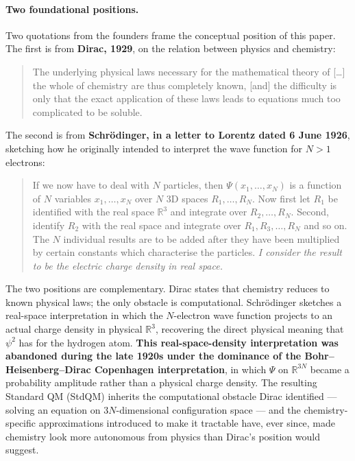 \documentclass[11pt]{article}
\begin{document}
\paragraph{Two foundational positions.}
Two quotations from the founders frame the conceptual position of this paper. The first is from \textbf{Dirac, 1929}, on the relation between physics and chemistry:

\begin{quote}
The underlying physical laws necessary for the mathematical theory of [\ldots] the whole of chemistry are thus completely known, [and] the difficulty is only that the exact application of these laws leads to equations much too complicated to be soluble.
\end{quote}

The second is from \textbf{Schr\"odinger, in a letter to Lorentz dated 6 June 1926}, sketching how he originally intended to interpret the wave function for $N>1$ electrons:

\begin{quote}
If we now have to deal with $N$ particles, then $\Psi(x_1, \ldots, x_N)$ is a function of $N$ variables $x_1, \ldots, x_N$ over $N$ 3D spaces $R_1, \ldots, R_N$. Now first let $R_1$ be identified with the real space $\mathbb{R}^3$ and integrate over $R_2, \ldots, R_N$. Second, identify $R_2$ with the real space and integrate over $R_1, R_3, \ldots, R_N$ and so on. The $N$ individual results are to be added after they have been multiplied by certain constants which characterise the particles. \emph{I consider the result to be the electric charge density in real space.}
\end{quote}

The two positions are complementary. Dirac states that chemistry reduces to known physical laws; the only obstacle is computational. Schr\"odinger sketches a real-space interpretation in which the $N$-electron wave function projects to an actual charge density in physical $\mathbb{R}^3$, recovering the direct physical meaning that $\psi^2$ has for the hydrogen atom. \textbf{This real-space-density interpretation was abandoned during the late 1920s under the dominance of the Bohr--Heisenberg--Dirac Copenhagen interpretation}, in which $\Psi$ on $\mathbb{R}^{3N}$ became a probability amplitude rather than a physical charge density. The resulting Standard QM (StdQM) inherits the computational obstacle Dirac identified --- solving an equation on $3N$-dimensional configuration space --- and the chemistry-specific approximations introduced to make it tractable have, ever since, made chemistry look more autonomous from physics than Dirac's position would suggest.
\end{document}
